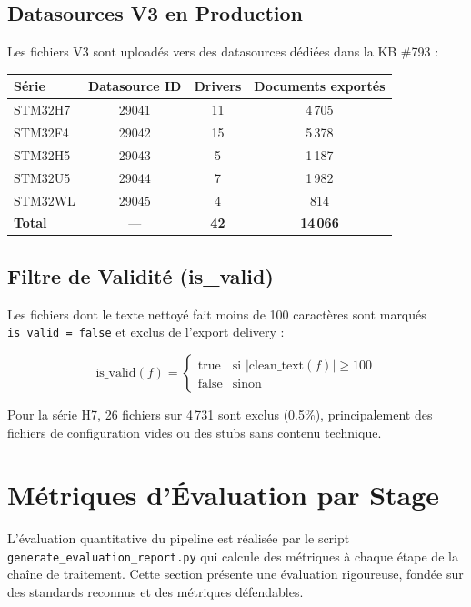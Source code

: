 \documentclass[12pt,a4paper]{report}
\begin{document}
\subsection{Datasources V3 en Production}

Les fichiers V3 sont uploadés vers des datasources dédiées dans la KB \#793 :

\begin{longtable}{lccc}
\toprule
\textbf{Série} & \textbf{Datasource ID} & \textbf{Drivers} & \textbf{Documents exportés} \\
\midrule
STM32H7 & 29041 & 11 & 4\,705 \\
STM32F4 & 29042 & 15 & 5\,378 \\
STM32H5 & 29043 & 5 & 1\,187 \\
STM32U5 & 29044 & 7 & 1\,982 \\
STM32WL & 29045 & 4 & 814 \\
\midrule
\textbf{Total} & --- & \textbf{42} & \textbf{14\,066} \\
\bottomrule
\end{longtable}

\subsection{Filtre de Validité (is\_valid)}

Les fichiers dont le texte nettoyé fait moins de 100 caractères sont marqués \texttt{is\_valid = false} et exclus de l'export delivery :

\begin{equation}
\text{is\_valid}(f) = \begin{cases} \text{true} & \text{si } |\text{clean\_text}(f)| \geq 100 \\ \text{false} & \text{sinon} \end{cases}
\end{equation}

Pour la série H7, 26 fichiers sur 4\,731 sont exclus (0.5\%), principalement des fichiers de configuration vides ou des stubs sans contenu technique.

\section{Métriques d'Évaluation par Stage}

L'évaluation quantitative du pipeline est réalisée par le script \texttt{generate\_evaluation\_report.py} qui calcule des métriques à chaque étape de la chaîne de traitement. Cette section présente une évaluation rigoureuse, fondée sur des standards reconnus et des métriques défendables.
\end{document}
